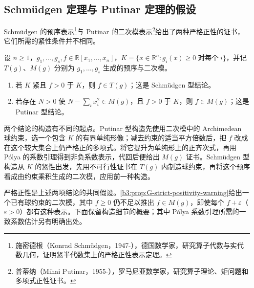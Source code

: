 \subsection{Schmüdgen 定理与 Putinar 定理的假设}
\label{b3:subsec:G04:03}

Schmüdgen 的预序表示\footnote{施密德根（Konrad Schmüdgen，1947-），德国数学家，研究算子代数与实代数几何，证明紧半代数集上的严格正性表示定理。}与 Putinar 的二次模表示\footnote{普蒂纳（Mihai Putinar，1955-），罗马尼亚数学家，研究算子理论、矩问题和多项式正性证书。}给出了两种严格正性的证书，它们所需的紧性条件并不相同。

\begin{theorem}[紧集上的严格正性]\label{b3:thm:compact-positivity-certificates}
	设 \(n\ge1\)，\(g_1,\ldots,g_s,f\in\mathbb R[x_1,\ldots,x_n]\)，\(K=\{x\in\mathbb R^n:g_i(x)\ge0\;\text{对每个}\;i\}\)，并记 \(T(g)\)、\(M(g)\) 分别为 \(g_1,\ldots,g_s\) 生成的预序与二次模。
	\begin{enumerate}
		\item 若 \(K\) 紧且 \(f>0\) 于 \(K\)，则 \(f\in T(g)\)；这是 Schmüdgen 型结论。
		\item 若存在 \(N>0\) 使 \(N-\sum_i x_i^2\in M(g)\)，且 \(f>0\) 于 \(K\)，则 \(f\in M(g)\)；这是 Putinar 型结论。
	\end{enumerate}
\end{theorem}

两个结论的构造有不同的起点。Putinar 型构造先使用二次模中的 Archimedean 球约束，选一个包含 \(K\) 的有界单纯形像；减去约束的适当平方倍数后，把 \(f\) 改成在这个较大集合上仍严格正的多项式。将它提升为单纯形上的正齐次式，再用 P\'olya 的系数引理得到非负系数表示，代回后便给出 \(M(g)\) 证书。Schmüdgen 型构造从 \(K\) 的紧性出发，先用不可行性证书在 \(T(g)\) 内制造球约束，再将这个预序看成由约束乘积生成的二次模，应用前一种构造。

\ProseParagraphBreak
严格正性是上述两项结论的共同假设。\cref{b3:prop:G-strict-positivity-warning}给出一个已有球约束的二次模，其中 \(f\ge0\) 仍不足以推出 \(f\in M(g)\)，即使每个 \(f+\varepsilon\)（\(\varepsilon>0\)）都有这种表示。下面保留构造细节的概要；其中 P\'olya 系数引理所需的一致系数估计另有明确出处。

